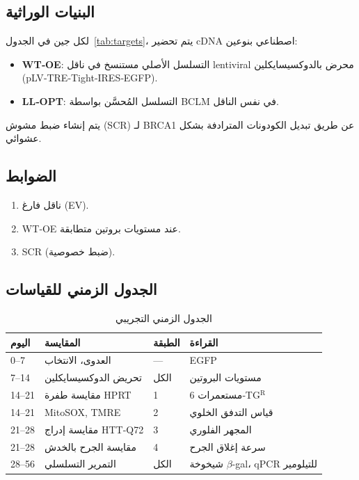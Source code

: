 \documentclass[11pt,a4paper]{article}
\begin{document}
	\subsection{البنيات الوراثية}
	لكل جين في الجدول~\ref{tab:targets}، يتم تحضير cDNA اصطناعي بنوعين:
	\begin{itemize}
		\item \textbf{WT‑OE}: التسلسل الأصلي مستنسخ في ناقل lentiviral محرض بالدوكسيسايكلين (pLV‑TRE‑Tight‑IRES‑EGFP).
		\item \textbf{LL‑OPT}: التسلسل المُحسَّن بواسطة BCLM في نفس الناقل.
	\end{itemize}
	يتم إنشاء ضبط مشوش (SCR) لـ BRCA1 عن طريق تبديل الكودونات المترادفة بشكل عشوائي.
	
	\subsection{الضوابط}
	\begin{enumerate}
		\item ناقل فارغ (EV).
		\item WT‑OE عند مستويات بروتين متطابقة.
		\item SCR (ضبط خصوصية).
	\end{enumerate}
	
	\subsection{الجدول الزمني للقياسات}
	\begin{table}[H]
		\centering
		\caption{الجدول الزمني التجريبي}
		\label{tab:schedule}
		\begin{tabular}{@{}llll@{}}
			\toprule
			\textbf{اليوم} & \textbf{المقايسة} & \textbf{الطبقة} & \textbf{القراءة} \\
			\midrule
			0–7   & العدوى، الانتخاب & --- & EGFP \\
			7–14  & تحريض الدوكسيسايكلين & الكل & مستويات البروتين \\
			14–21 & مقايسة طفرة HPRT & 1 & مستعمرات 6‑TG\(^{\mathrm{R}}\) \\
			14–21 & MitoSOX, TMRE & 2 & قياس التدفق الخلوي \\
			21–28 & مقايسة إدراج HTT‑Q72 & 3 & المجهر الفلوري \\
			21–28 & مقايسة الجرح بالخدش & 4 & سرعة إغلاق الجرح \\
			28–56 & التمرير التسلسلي & الكل & شيخوخة \(\beta\)-gal، qPCR للتيلومير \\
			\bottomrule
		\end{tabular}
	\end{table}
	
\end{document}
